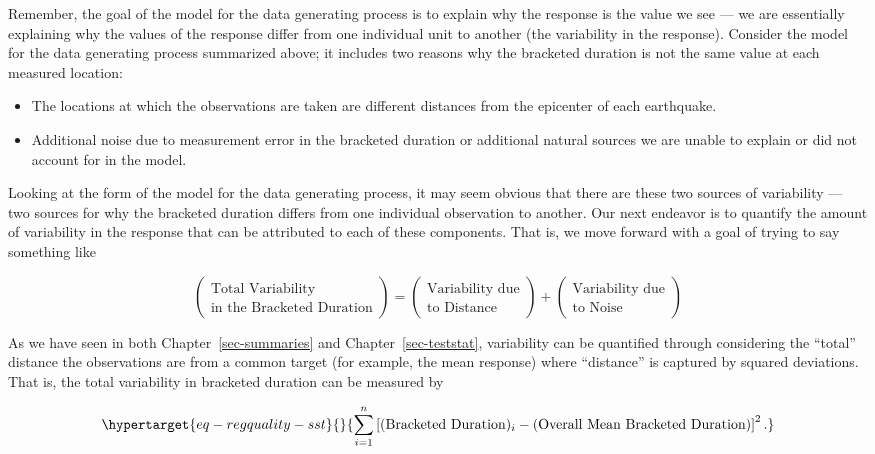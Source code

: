 \documentclass[
  letterpaper,
  DIV=11,
  numbers=noendperiod]{scrreprt}
\providecommand{\tightlist}{%
  \setlength{\itemsep}{0pt}\setlength{\parskip}{0pt}}\usepackage{longtable,booktabs,array}
\theoremstyle{definition}
\theoremstyle{definition}
\theoremstyle{plain}
\theoremstyle{remark}
\begin{document}
Remember, the goal of the model for the data generating process is to
explain why the response is the value we see --- we are essentially
explaining why the values of the response differ from one individual
unit to another (the variability in the response). Consider the model
for the data generating process summarized above; it includes two
reasons why the bracketed duration is not the same value at each
measured location:

\begin{itemize}
\tightlist
\item
  The locations at which the observations are taken are different
  distances from the epicenter of each earthquake.
\item
  Additional noise due to measurement error in the bracketed duration or
  additional natural sources we are unable to explain or did not account
  for in the model.
\end{itemize}

Looking at the form of the model for the data generating process, it may
seem obvious that there are these two sources of variability --- two
sources for why the bracketed duration differs from one individual
observation to another. Our next endeavor is to quantify the amount of
variability in the response that can be attributed to each of these
components. That is, we move forward with a goal of trying to say
something like

\[\begin{pmatrix} \text{Total Variability} \\ \text{in the Bracketed Duration} \end{pmatrix} = \begin{pmatrix} \text{Variability due} \\ \text{to Distance} \end{pmatrix} + \begin{pmatrix} \text{Variability due} \\ \text{to Noise} \end{pmatrix}\]

As we have seen in both Chapter~\ref{sec-summaries} and
Chapter~\ref{sec-teststat}, variability can be quantified through
considering the ``total'' distance the observations are from a common
target (for example, the mean response) where ``distance'' is captured
by squared deviations. That is, the total variability in bracketed
duration can be measured by

\begin{equation}\protect\hypertarget{eq-regquality-sst}{}{\sum_{i=1}^{n} \left[(\text{Bracketed Duration})_i - (\text{Overall Mean Bracketed Duration})\right]^2.}\label{eq-regquality-sst}\end{equation}
\end{document}
